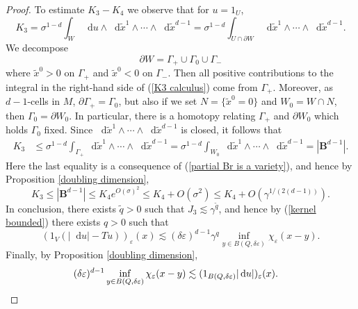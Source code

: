 \documentclass[reqno,12pt,letterpaper]{amsart}
\newcommand{\Ball}{\mathbf{B}}
\newcommand*\dif{\mathop{}\!\mathrm{d}}
\theoremstyle{definition}
\numberwithin{equation}{section}
\begin{document}
\begin{proof}
To estimate $K_3 - K_4$ we observe that for $u = 1_U$,
\begin{equation}\label{K3 calculus}
K_3 = \sigma^{1 - d} \int_W \dif u \wedge \dif \tilde x^1 \wedge \cdots \wedge \dif \tilde x^{d - 1} = \sigma^{1 - d} \int_{U \cap \partial W} \dif \tilde x^1 \wedge \cdots \wedge \dif \tilde x^{d - 1}.
\end{equation}
We decompose
$$\partial W = \Gamma_+ \cup \Gamma_0 \cup \Gamma_-$$
where $\tilde x^0 > 0$ on $\Gamma_+$ and $\tilde x^0 < 0$ on $\Gamma_-$. Then all positive contributions to the integral in the right-hand side of (\ref{K3 calculus}) come from $\Gamma_+$.
Moreover, as $d-1$-cells in $M$, $\partial \Gamma_+ = \Gamma_0$, but also if we set $N = \{\tilde x^0 = 0\}$ and $W_0 = W \cap N$, then $\Gamma_0 = \partial W_0$.
In particular, there is a homotopy relating $\Gamma_+$ and $\partial W_0$ which holds $\Gamma_0$ fixed.
Since $\dif \tilde x^1 \wedge \cdots \wedge \dif \tilde x^{d - 1}$ is closed, it follows that
\begin{align*}
K_3 &\leq \sigma^{1 - d} \int_{\Gamma_+} \dif \tilde x^1 \wedge \cdots \wedge \dif \tilde x^{d - 1} = \sigma^{1 - d} \int_{W_0} \dif \tilde x^1 \wedge \cdots \wedge \dif \tilde x^{d - 1} = |\Ball^{d - 1}|.
\end{align*}
Here the last equality is a consequence of (\ref{partial Br is a variety}), and hence by Proposition \ref{doubling dimension},
$$K_3 \leq |\Ball^{d - 1}| \leq K_4 e^{O(\sigma)^2} \leq K_4 + O(\sigma^2) \leq K_4 + O(\gamma^{1/(2(d - 1))}).$$
In conclusion, there exists $\tilde q > 0$ such that $J_3 \lesssim \gamma^{\tilde q}$, and hence by (\ref{kernel bounded}) there exists $q > 0$ such that
$$(1_V(|\dif u| - Tu))_\varepsilon(x) \lesssim (\delta\varepsilon)^{d - 1} \gamma^q \inf_{y \in B(Q, \delta\varepsilon)} \chi_\varepsilon(x - y).$$
Finally, by Proposition \ref{doubling dimension},
\begin{align*}
(\delta\varepsilon)^{d - 1} \inf_{y \in B(Q, \delta\varepsilon)} \chi_\varepsilon(x - y) &\lesssim (1_{B(Q, \delta\varepsilon)} |\dif u|)_\varepsilon(x). \qedhere
\end{align*}
\end{proof}
\end{document}
